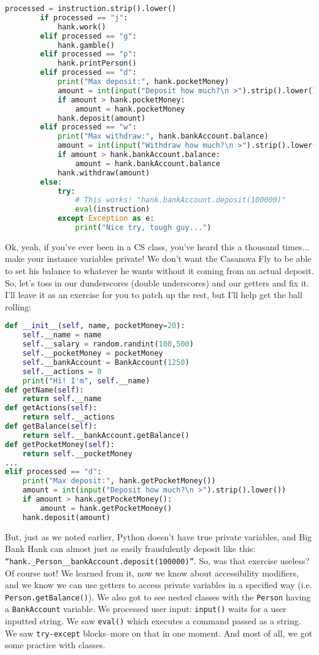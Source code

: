 \documentclass[11pt, twoside, reqno]{book}
\begin{document}
\begin{lstlisting}[language=Python]
        processed = instruction.strip().lower()
        if processed == "j":
            hank.work()
        elif processed == "g":
            hank.gamble()
        elif processed == "p":
            hank.printPerson()
        elif processed == "d":
            print("Max deposit:", hank.pocketMoney)
            amount = int(input("Deposit how much?\n >").strip().lower())
            if amount > hank.pocketMoney: 
                amount = hank.pocketMoney
            hank.deposit(amount)
        elif processed == "w":
            print("Max withdraw:", hank.bankAccount.balance)
            amount = int(input("Withdraw how much?\n >").strip().lower())
            if amount > hank.bankAccount.balance: 
                amount = hank.bankAccount.balance
            hank.withdraw(amount)
        else:
            try:
                # This works! "hank.bankAccount.deposit(100000)"
                eval(instruction)
            except Exception as e:
                print("Nice try, tough guy...")
\end{lstlisting}

Ok, yeah, if you've ever been in a CS class, you've heard this a thousand times... make your instance variables private! We don't want the Casanova Fly to be able to set his balance to whatever he wants without it coming from an actual deposit. So, let's toss in our dunderscores (double underscores) and our getters and fix it. I'll leave it as an exercise for you to patch up the rest, but I'll help get the ball rolling:
\begin{lstlisting}[language=Python]
def __init__(self, name, pocketMoney=20):
    self.__name = name
    self.__salary = random.randint(100,500)
    self.__pocketMoney = pocketMoney
    self.__bankAccount = BankAccount(1250)
    self.__actions = 0
    print("Hi! I'm", self.__name)
def getName(self):
    return self.__name
def getActions(self):
    return self.__actions
def getBalance(self):
    return self.__bankAccount.getBalance()
def getPocketMoney(self):
    return self.__pocketMoney
...
elif processed == "d":
    print("Max deposit:", hank.getPocketMoney())
    amount = int(input("Deposit how much?\n >").strip().lower())
    if amount > hank.getPocketMoney(): 
        amount = hank.getPocketMoney()
    hank.deposit(amount)
\end{lstlisting}

But, just as we noted earlier, Python doesn't have true private variables, and Big Bank Hank can almost just as easily fraudulently deposit like this: \texttt{``hank.\_Person\_\_bankAccount.deposit(100000)''}. So, was that exercise useless? Of course not! We learned from it, now we know about accessibility modifiers, and we know we can use getters to access private variables in a specified way (i.e. \texttt{Person.getBalance()}). We also got to see nested classes with the \texttt{Person} having a \texttt{BankAccount} variable. We processed user input: \texttt{input()} waits for a user inputted string. We saw \texttt{eval()} which executes a command passed as a string. We saw \texttt{try-except} blocks--more on that in one moment. And most of all, we got some practice with classes.
\end{document}
